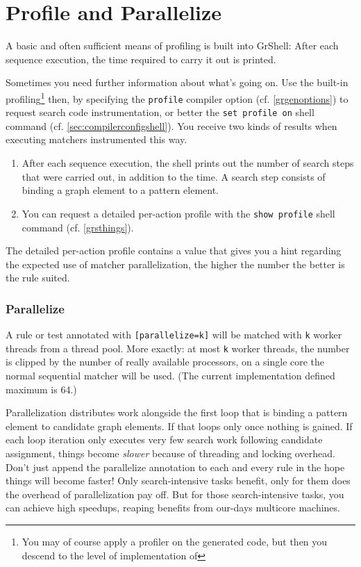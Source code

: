 \section{Profile and Parallelize}\label{sec:performanceparallel}

A basic and often sufficient means of profiling is built into GrShell:
After each sequence execution, the time required to carry it out is printed.

Sometimes you need further information about what's going on.
Use the built-in profiling\footnote{You may of course apply a profiler on the generated code, but then you descend to the level of implementation of \GrG} then, by specifying the \texttt{profile} compiler option (cf. \ref{grgenoptions}) to request search code instrumentation, or better the \texttt{set profile on} shell command (cf. \ref{sec:compilerconfigshell}).
You receive two kinds of results when executing matchers instrumented this way.

\begin{enumerate}
	\item After each sequence execution, the shell prints out the number of search steps that were carried out, in addition to the time. 
		A search step consists of binding a graph element to a pattern element.
	\item You can request a detailed per-action profile with the \texttt{show profile} shell command (cf. \ref{grsthings}).
\end{enumerate}

The detailed per-action profile contains a value that gives you a hint regarding the expected use of matcher parallelization, the higher the number the better is the rule suited.

\subsubsection*{Parallelize}
A rule or test annotated with \texttt{[parallelize=k]} will be matched with \texttt{k} worker threads from a thread pool.
More exactly: at most \texttt{k} worker threads, the number is clipped by the number of really available processors, on a single core the normal sequential matcher will be used.
(The current implementation defined maximum is 64.)

Parallelization distributes work alongside the first loop that is binding a pattern element to candidate graph elements.
If that loops only once nothing is gained.
If each loop iteration only executes very few search work following candidate assignment,
things become \emph{slower} because of threading and locking overhead.
Don't just append the parallelize annotation to each and every rule in the hope things will become faster!
Only search-intensive tasks benefit, only for them does the overhead of parallelization pay off.
But for those search-intensive tasks, you can achieve high speedups, reaping benefits from our-days multicore machines. 

